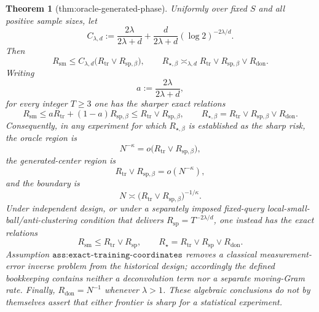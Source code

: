 \documentclass{article}
\newtheorem{theorem}{Theorem}
\begin{document}
\begin{theorem}[thm:oracle-generated-phase]\label{thm:oracle-generated-phase}
Uniformly over fixed \(S\) and all positive sample sizes, let
\[
C_{\lambda,d}:=\frac{2\lambda}{2\lambda+d}
+\frac{d}{2\lambda+d}(\log 2)^{-2\lambda/d}.
\]
Then
\[
R_{\mathrm{sm}}
\leq C_{\lambda,d}
\bigl(R_{\mathrm{tr}}\vee R_{\mathrm{sp},\beta}\bigr),
\qquad
R_{\star,\beta}
\asymp_{\lambda,d}
R_{\mathrm{tr}}\vee R_{\mathrm{sp},\beta}\vee R_{\mathrm{don}}.
\]
Writing
\[
a:=\frac{2\lambda}{2\lambda+d},
\]
for every integer \(T\geq 3\) one has the sharper exact relations
\[
R_{\mathrm{sm}}
\leq aR_{\mathrm{tr}}+(1-a)R_{\mathrm{sp},\beta}
\leq R_{\mathrm{tr}}\vee R_{\mathrm{sp},\beta},
\qquad
R_{\star,\beta}
=R_{\mathrm{tr}}\vee R_{\mathrm{sp},\beta}\vee R_{\mathrm{don}}.
\]
Consequently, in any experiment for which \(R_{\star,\beta}\) is established as the sharp risk, the oracle region is
\[
N^{-\kappa}=o\bigl(R_{\mathrm{tr}}\vee R_{\mathrm{sp},\beta}\bigr),
\]
the generated-center region is
\[
R_{\mathrm{tr}}\vee R_{\mathrm{sp},\beta}=o(N^{-\kappa}),
\]
and the boundary is
\[
N\asymp
\bigl(R_{\mathrm{tr}}\vee R_{\mathrm{sp},\beta}\bigr)^{-1/\kappa}.
\]
Under independent design, or under a separately imposed fixed-query local-small-ball/anti-clustering condition that delivers \(R_{\mathrm{sp}}=T^{-2\lambda/d}\), one instead has the exact relations
\[
R_{\mathrm{sm}}\leq R_{\mathrm{tr}}\vee R_{\mathrm{sp}},
\qquad
R_\star=R_{\mathrm{tr}}\vee R_{\mathrm{sp}}\vee R_{\mathrm{don}}.
\]
Assumption \(\texttt{ass:exact-training-coordinates}\) removes a classical measurement-error inverse problem from the historical design; accordingly the defined bookkeeping contains neither a deconvolution term nor a separate moving-Gram rate. Finally, \(R_{\mathrm{don}}=N^{-1}\) whenever \(\lambda>1\). These algebraic conclusions do not by themselves assert that either frontier is sharp for a statistical experiment.
\end{theorem}
\end{document}

